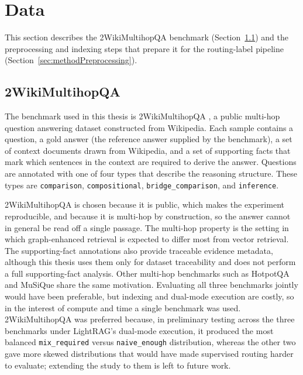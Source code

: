 \documentclass[english, bibtex]{kththesis}               %
\numberwithin{listing}{chapter}
\begin{document}
\section{Data}
\label{sec:methodData}

This section describes the 2WikiMultihopQA benchmark (Section~\ref{sec:method2wiki}) and the preprocessing and indexing steps that prepare it for the routing-label pipeline (Section~\ref{sec:methodPreprocessing}).

\subsection{2WikiMultihopQA}
\label{sec:method2wiki}

The benchmark used in this thesis is 2WikiMultihopQA \cite{ho2020twowiki}, a public multi-hop question answering dataset constructed from Wikipedia. Each sample contains a question, a gold answer (the reference answer supplied by the benchmark), a set of context documents drawn from Wikipedia, and a set of supporting facts that mark which sentences in the context are required to derive the answer. Questions are annotated with one of four types that describe the reasoning structure. These types are \texttt{comparison}, \texttt{compositional}, \texttt{bridge\_comparison}, and \texttt{inference}.

2WikiMultihopQA is chosen because it is public, which makes the experiment reproducible, and because it is multi-hop by construction, so the answer cannot in general be read off a single passage. The multi-hop property is the setting in which graph-enhanced retrieval is expected to differ most from vector retrieval. The supporting-fact annotations also provide traceable evidence metadata, although this thesis uses them only for dataset traceability and does not perform a full supporting-fact analysis. Other multi-hop benchmarks such as HotpotQA and MuSiQue \cite{yang2018hotpotqa,trivedi2022musique} share the same motivation. Evaluating all three benchmarks jointly would have been preferable, but indexing and dual-mode execution are costly, so in the interest of compute and time a single benchmark was used. 2WikiMultihopQA was preferred because, in preliminary testing across the three benchmarks under LightRAG's dual-mode execution, it produced the most balanced \texttt{mix\_required} versus \texttt{naive\_enough} distribution, whereas the other two gave more skewed distributions that would have made supervised routing harder to evaluate; extending the study to them is left to future work.
\end{document}
